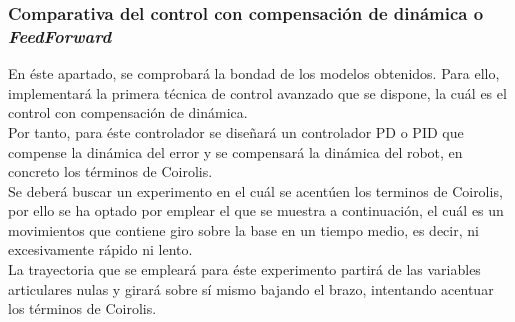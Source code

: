 \newpage
\subsubsection{Comparativa del control con compensación de dinámica o \textit{FeedForward}}
En éste apartado, se comprobará la bondad de los modelos obtenidos. Para ello, implementará la primera técnica de control avanzado que se dispone, la cuál es el control con compensación de dinámica.\\
Por tanto, para éste controlador se diseñará un controlador PD o PID que compense la dinámica del error y se compensará la dinámica del robot, en concreto los términos de Coirolis.\\

Se deberá buscar un experimento en el cuál se acentúen los terminos de Coirolis, por ello se ha optado por emplear el que se muestra a continuación, el cuál es un movimientos que contiene giro sobre la base en un tiempo medio, es decir, ni excesivamente rápido ni lento. \\
La trayectoria que se empleará para éste experimento partirá de las variables articulares nulas y girará sobre sí mismo bajando el brazo, intentando acentuar los términos de Coirolis.\\

